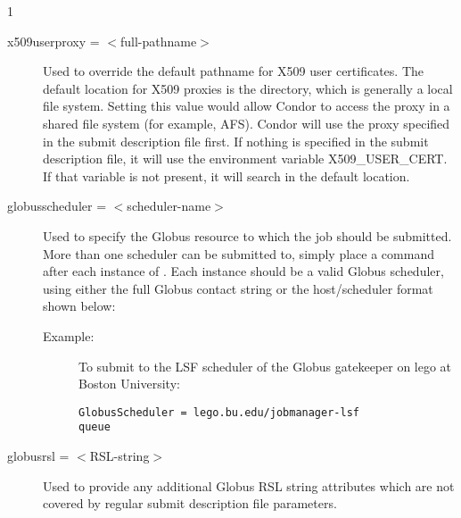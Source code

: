 \begin{ManPage}{\label{man-condor-submit}}{1}
\begin{description}
% 


\item[x509userproxy = $<$full-pathname$>$] Used to override the default
pathname for X509 user certificates. The default location for X509 proxies
is the  directory,
which is generally a local file system.
Setting
this value would allow Condor to access the proxy in a shared file system
(for example, AFS).
Condor will use the proxy specified in the submit description file first.
If nothing is specified in the submit description file,
it will use the environment variable X509\_USER\_CERT.
If that variable is not present,
it will search in the default location.


\item[globusscheduler = $<$scheduler-name$>$] Used to specify the 
Globus resource to which the job should be submitted. More than one scheduler
can be submitted to, simply place a  command after each instance
of .
Each instance should be a valid Globus scheduler, using
either the full Globus contact string or the host/scheduler format shown below:
\begin{description}
\item[Example:]
To submit to the LSF scheduler of the Globus gatekeeper on lego at 
Boston University:
\begin{verbatim}
GlobusScheduler = lego.bu.edu/jobmanager-lsf
queue
\end{verbatim}
\end{description}


\item[globusrsl = $<$RSL-string$>$] Used to provide any additional Globus RSL
string attributes which are not covered by regular submit description
file parameters.


\end{description}
\end{ManPage}
